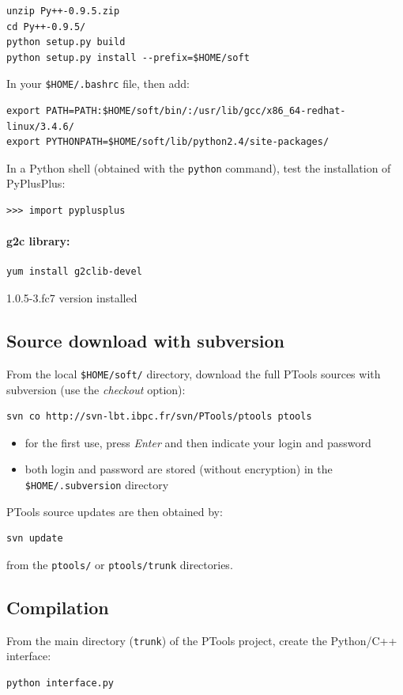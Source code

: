\documentclass[12pt,a4paper]{article}
\begin{document}
\begin{verbatim}
unzip Py++-0.9.5.zip 
cd Py++-0.9.5/
python setup.py build
python setup.py install --prefix=$HOME/soft
\end{verbatim}

In your {\tt \$HOME/.bashrc} file, then add:
\begin{verbatim}
export PATH=PATH:$HOME/soft/bin/:/usr/lib/gcc/x86_64-redhat-linux/3.4.6/
export PYTHONPATH=$HOME/soft/lib/python2.4/site-packages/
\end{verbatim}

In a Python shell (obtained with the {\tt python} command), test the installation
of PyPlusPlus:
\begin{verbatim}
>>> import pyplusplus
\end{verbatim}

\paragraph{g2c library: }

\begin{verbatim}
yum install g2clib-devel
\end{verbatim}
1.0.5-3.fc7 version installed


\subsection{Source download with subversion}

From the local {\tt \$HOME/soft/} directory, download the full PTools sources with subversion (use the {\it checkout} option):
\begin{verbatim}
svn co http://svn-lbt.ibpc.fr/svn/PTools/ptools ptools
\end{verbatim}

\begin{itemize}
\item for the first use, press {\it Enter} and then indicate your login and password
\item both login and password are stored (without encryption) in the {\tt \$HOME/.subversion} directory
\end{itemize}

PTools source updates are then obtained by:
\begin{verbatim}
svn update
\end{verbatim}
from the {\tt ptools/} or {\tt ptools/trunk} directories.


\subsection{Compilation}
From the main directory ({\tt trunk}) of the PTools project, create the Python/C++ interface:
\begin{verbatim}
python interface.py
\end{verbatim}
\end{document}
